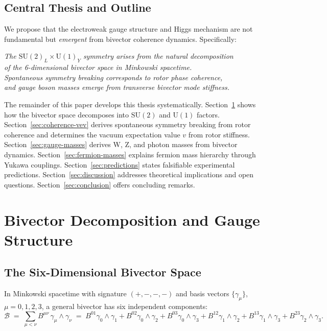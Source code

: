 \documentclass[11pt,a4paper]{article}
\newcommand{\Biv}{\mathcal{B}}
\newcommand{\SU}{\mathrm{SU}}
\newcommand{\U}{\mathrm{U}}
\theoremstyle{definition}
\theoremstyle{plain}
\theoremstyle{remark}
\begin{document}
\subsection{Central Thesis and Outline}

We propose that the electroweak gauge structure and Higgs mechanism are not fundamental but \emph{emergent} from bivector coherence dynamics. Specifically:

\begin{center}
\textit{The $\SU(2)_L \times \U(1)_Y$ symmetry arises from the natural decomposition \\
of the 6-dimensional bivector space in Minkowski spacetime. \\
Spontaneous symmetry breaking corresponds to rotor phase coherence, \\
and gauge boson masses emerge from transverse bivector mode stiffness.}
\end{center}

The remainder of this paper develops this thesis systematically. Section~\ref{sec:bivector-decomposition} shows how the bivector space decomposes into $\SU(2)$ and $\U(1)$ factors. Section~\ref{sec:coherence-vev} derives spontaneous symmetry breaking from rotor coherence and determines the vacuum expectation value $v$ from rotor stiffness. Section~\ref{sec:gauge-masses} derives W, Z, and photon masses from bivector dynamics. Section~\ref{sec:fermion-masses} explains fermion mass hierarchy through Yukawa couplings. Section~\ref{sec:predictions} states falsifiable experimental predictions. Section~\ref{sec:discussion} addresses theoretical implications and open questions. Section~\ref{sec:conclusion} offers concluding remarks.

\vspace{1em}

\section{Bivector Decomposition and Gauge Structure}\label{sec:bivector-decomposition}

\subsection{The Six-Dimensional Bivector Space}

In Minkowski spacetime with signature $(+,-,-,-)$ and basis vectors $\{\gamma_\mu\}$, $\mu = 0,1,2,3$, a general bivector has six independent components:
\begin{equation}
  \Biv \;=\; \sum_{\mu<\nu} B^{\mu\nu}\, \gamma_\mu \wedge \gamma_\nu
  \;=\; B^{01}\gamma_0\wedge\gamma_1 + B^{02}\gamma_0\wedge\gamma_2 + B^{03}\gamma_0\wedge\gamma_3
  + B^{12}\gamma_1\wedge\gamma_2 + B^{13}\gamma_1\wedge\gamma_3 + B^{23}\gamma_2\wedge\gamma_3.
\end{equation}
\end{document}

